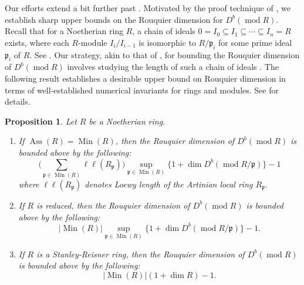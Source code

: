 \documentclass[11pt]{amsart}
\newcounter{intro}
\newtheorem{introprop}[intro]{Proposition}
\theoremstyle{plain}
\theoremstyle{definition}
\numberwithin{equation}{section}
\numberwithin{theorem}{section}
\begin{document}
Our efforts extend a bit further past . Motivated by the proof technique of , we establish sharp upper bounds on the Rouquier dimension for $D^b (\operatorname{mod}R)$. Recall that for a Noetherian ring $R$, a chain of ideals $0=I_0\subseteq I_1\subseteq\cdots\subseteq I_n=R$ exists, where each $R$-module $I_i/I_{i-1}$ is isomorphic to $R/\mathfrak{p}_i$ for some prime ideal $\mathfrak{p}_i$
of $R$. See \cite[Theorem 6.4]{Matsumura:1986}. Our strategy, akin to that of \cite[Proposition 3.9]{Aihara/Takahashi:2015}, for bounding the Rouquier dimension of $D^b(\operatorname{mod}R)$ involves  studying the length of such a chain of ideals . The following result establishes a desirable upper bound on Rouquier dimension in terms of well-established numerical invariants for rings and modules. See  for details.

\begin{introprop}\label{prop:rouq_dim_bounds}
    Let $R$ be a Noetherian ring.
    \begin{enumerate}
        \item If $\operatorname{Ass}(R)=\operatorname{Min}(R)$, then the Rouquier dimension of $D^b(\operatorname{mod} R)$ is bounded above by the following:
        \begin{displaymath}
            \big(\sum_{\mathfrak{p} \in \operatorname{Min}(R)} \ell\ell(R_\mathfrak{p})\big) \underset{\mathfrak{p} \in \operatorname{Min}(R)}{\sup}\{1+\dim D^b(\operatorname{mod} R/\mathfrak{p}) \} -1
        \end{displaymath}
        where $\ell \ell(R_\mathfrak{p})$ denotes Loewy length of the Artinian local ring $R_\mathfrak{p}$.
        \item If $R$ is reduced, then the Rouquier dimension of $D^b (\operatorname{mod}R)$ is bounded above by the following:
        \begin{displaymath}
            |\operatorname{Min}(R)| \underset{\mathfrak{p} \in \operatorname{Min}(R)}{\sup} \{ 1+ \dim D^b (\operatorname{mod}R/\mathfrak{p}) \} -1.
        \end{displaymath}
        \item If $R$ is a Stanley-Reisner ring, then the Rouquier dimension of $D^b (\operatorname{mod}R)$ is bounded above by the following:
        \begin{displaymath}
            |\operatorname{Min}(R)| ( 1 + \dim R) - 1.
        \end{displaymath}
    \end{enumerate}
\end{introprop}
\end{document}
